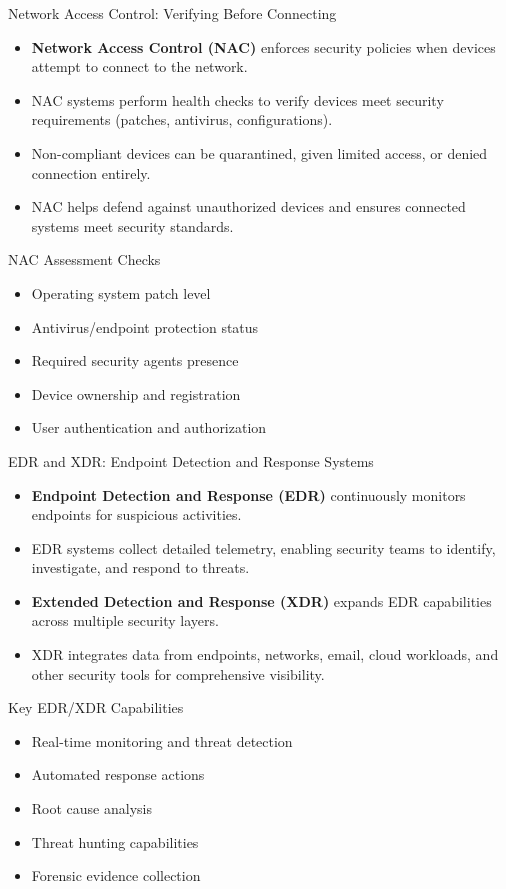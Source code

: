 \documentclass{beamer}
\begin{document}
\begin{frame}{Network Access Control: Verifying Before Connecting}
\begin{itemize}
\item \textbf{Network Access Control (NAC)} enforces security policies when devices attempt to connect to the network.
\item NAC systems perform health checks to verify devices meet security requirements (patches, antivirus, configurations).
\item Non-compliant devices can be quarantined, given limited access, or denied connection entirely.
\item NAC helps defend against unauthorized devices and ensures connected systems meet security standards.
\end{itemize}

\begin{exampleblock}{NAC Assessment Checks}
\begin{itemize}
\item Operating system patch level
\item Antivirus/endpoint protection status
\item Required security agents presence
\item Device ownership and registration
\item User authentication and authorization
\end{itemize}
\end{exampleblock}
\end{frame}

\begin{frame}{EDR and XDR: Endpoint Detection and Response Systems}
\begin{itemize}
\item \textbf{Endpoint Detection and Response (EDR)} continuously monitors endpoints for suspicious activities.
\item EDR systems collect detailed telemetry, enabling security teams to identify, investigate, and respond to threats.
\item \textbf{Extended Detection and Response (XDR)} expands EDR capabilities across multiple security layers.
\item XDR integrates data from endpoints, networks, email, cloud workloads, and other security tools for comprehensive visibility.
\end{itemize}

\begin{alertblock}{Key EDR/XDR Capabilities}
\begin{itemize}
\item Real-time monitoring and threat detection
\item Automated response actions
\item Root cause analysis
\item Threat hunting capabilities
\item Forensic evidence collection
\end{itemize}
\end{alertblock}
\end{frame}
\end{document}
